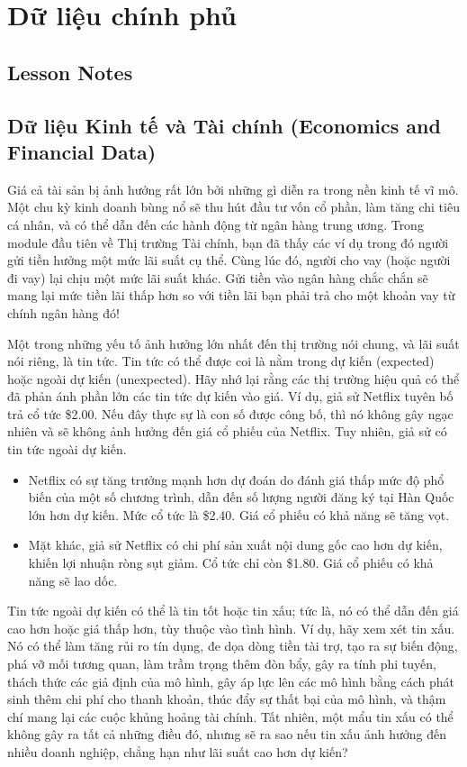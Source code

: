 \chapter{Dữ liệu chính phủ}
\label{ch:M1L2}

\section*{Lesson Notes}
\section[Dữ liệu Kinh tế và Tài chính]{Dữ liệu Kinh tế và Tài chính (Economics and Financial Data)}

Giá cả tài sản bị ảnh hưởng rất lớn bởi những gì diễn ra trong nền kinh tế vĩ mô. Một chu kỳ kinh doanh bùng nổ sẽ thu hút đầu tư vốn cổ phần, làm tăng chi tiêu cá nhân, và có thể dẫn đến các hành động từ ngân hàng trung ương. Trong module đầu tiên về Thị trường Tài chính, bạn đã thấy các ví dụ trong đó người gửi tiền hưởng một mức lãi suất cụ thể. Cùng lúc đó, người cho vay (hoặc người đi vay) lại chịu một mức lãi suất khác. Gửi tiền vào ngân hàng chắc chắn sẽ mang lại mức tiền lãi thấp hơn so với tiền lãi bạn phải trả cho một khoản vay từ chính ngân hàng đó!

Một trong những yếu tố ảnh hưởng lớn nhất đến thị trường nói chung, và lãi suất nói riêng, là tin tức. Tin tức có thể được coi là nằm trong dự kiến (expected) hoặc ngoài dự kiến (unexpected). Hãy nhớ lại rằng các thị trường hiệu quả có thể đã phản ánh phần lớn các tin tức dự kiến vào giá. Ví dụ, giả sử Netflix tuyên bố trả cổ tức \$2.00. Nếu đây thực sự là con số được công bố, thì nó không gây ngạc nhiên và sẽ không ảnh hưởng đến giá cổ phiếu của Netflix. Tuy nhiên, giả sử có tin tức ngoài dự kiến.

\begin{itemize}
    \item Netflix có sự tăng trưởng mạnh hơn dự đoán do đánh giá thấp mức độ phổ biến của một số chương trình, dẫn đến số lượng người đăng ký tại Hàn Quốc lớn hơn dự kiến. Mức cổ tức là \$2.40. Giá cổ phiếu có khả năng sẽ tăng vọt.
    \item Mặt khác, giả sử Netflix có chi phí sản xuất nội dung gốc cao hơn dự kiến, khiến lợi nhuận ròng sụt giảm. Cổ tức chỉ còn \$1.80. Giá cổ phiếu có khả năng sẽ lao dốc.
\end{itemize}

Tin tức ngoài dự kiến có thể là tin tốt hoặc tin xấu; tức là, nó có thể dẫn đến giá cao hơn hoặc giá thấp hơn, tùy thuộc vào tình hình. Ví dụ, hãy xem xét tin xấu. Nó có thể làm tăng rủi ro tín dụng, đe dọa dòng tiền tài trợ, tạo ra sự biến động, phá vỡ mối tương quan, làm trầm trọng thêm đòn bẩy, gây ra tính phi tuyến, thách thức các giả định của mô hình, gây áp lực lên các mô hình bằng cách phát sinh thêm chi phí cho thanh khoản, thúc đẩy sự thất bại của mô hình, và thậm chí mang lại các cuộc khủng hoảng tài chính. Tất nhiên, một mẩu tin xấu có thể không gây ra tất cả những điều đó, nhưng sẽ ra sao nếu tin xấu ảnh hưởng đến nhiều doanh nghiệp, chẳng hạn như lãi suất cao hơn dự kiến?

